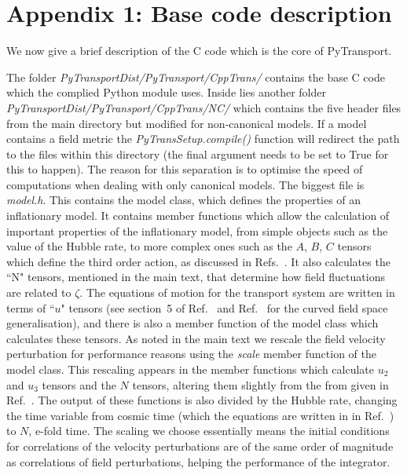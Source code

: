 \documentclass[10pt,
amsmath,amssymb,
aps,prd,nofootinbib,eqsecnum,a4paper]{revtex4}
\newcommand{\CC}{C\nolinebreak\hspace{-.05em}\raisebox{.4ex}{\tiny\bf +}\nolinebreak\hspace{-.10em}\raisebox{.4ex}{\tiny\bf +}}
\def\CC{{C\nolinebreak[4]\hspace{-.05em}\raisebox{.4ex}{\tiny\bf ++}}}
\def\S{ }
\begin{document}
\section*{Appendix 1:  Base code description}
We now give a brief description of the \CC \S  code which is the core of PyTransport. 

\noindent The folder  {\it PyTransportDist/PyTransport/CppTrans/} contains the base \CC \S code which the complied Python module uses.
Inside lies another folder {\it PyTransportDist/PyTransport/CppTrans/NC/} which contains the 
five header files from the main directory but modified for non-canonical models. If a model contains a field metric the {\it PyTransSetup.compile()} function will redirect the path to the files within this directory (the final argument needs to be set to True
for this to happen). 
The reason for this separation is to optimise the speed of computations when dealing with only canonical models.
The biggest file is {\it model.h}. This contains the model class, which 
defines the properties of an inflationary model. It contains member functions which allow the calculation of important 
properties of the inflationary model, from simple objects such as the value of the Hubble rate, to more complex ones such 
as the 
$A$, $B$, $C$ tensors which define the third order action, as discussed in Refs.~\cite{Dias:2016rjq,xxx2}. It also calculates the ``N" tensors, 
mentioned in the main text,
that determine how field fluctuations are related to $\zeta$. 
The equations of motion for the transport system are written in terms of ``$u$" tensors (see section~5 of Ref.~\cite{Dias:2016rjq} and Ref.~\cite{xxx2} for the curved field space generalisation), and there is also a member function of the model class which calculates these tensors. As noted in the main text 
we rescale the field velocity perturbation for performance 
reasons using the {\it scale} member function of the model class. This rescaling appears in the 
member functions which calculate $u_2$ and $u_3$ tensors and the $N$ tensors, altering them slightly 
from the from given in Ref.~\cite{Dias:2016rjq}.
The output of these functions is also divided by the Hubble rate, changing the 
time variable from cosmic time (which the equations are written in in Ref.~\cite{Dias:2016rjq}) 
to $N$, e-fold time.  The scaling we choose essentially means the initial conditions for 
correlations of the velocity perturbations
are of the same order of magnitude as correlations of field perturbations, helping the performance of the integrator. 
\end{document}
